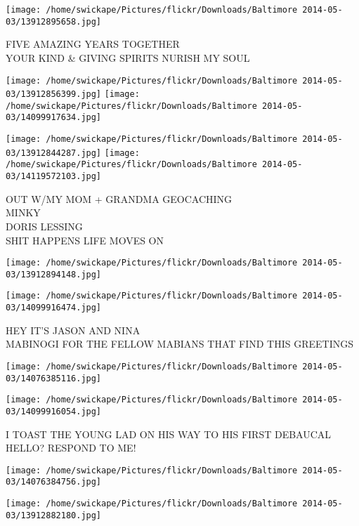 \documentclass[10pt,letterpaper]{article}
\begin{document}
\vspace{0.25in}
\texttt{[image: /home/swickape/Pictures/flickr/Downloads/Baltimore 2014-05-03/13912895658.jpg]}

FIVE AMAZING YEARS TOGETHER\\
YOUR KIND \& GIVING SPIRITS NURISH MY SOUL
\pagebreak

\texttt{[image: /home/swickape/Pictures/flickr/Downloads/Baltimore 2014-05-03/13912856399.jpg]}
\texttt{[image: /home/swickape/Pictures/flickr/Downloads/Baltimore 2014-05-03/14099917634.jpg]}

\texttt{[image: /home/swickape/Pictures/flickr/Downloads/Baltimore 2014-05-03/13912844287.jpg]}
\texttt{[image: /home/swickape/Pictures/flickr/Downloads/Baltimore 2014-05-03/14119572103.jpg]}

OUT W/MY MOM + GRANDMA GEOCACHING\\
MINKY\\
DORIS LESSING\\
SHIT HAPPENS LIFE MOVES ON
\pagebreak

\texttt{[image: /home/swickape/Pictures/flickr/Downloads/Baltimore 2014-05-03/13912894148.jpg]}

\vspace{0.25in}
\texttt{[image: /home/swickape/Pictures/flickr/Downloads/Baltimore 2014-05-03/14099916474.jpg]}

HEY IT'S JASON AND NINA\\
MABINOGI FOR THE FELLOW MABIANS THAT FIND THIS GREETINGS
\pagebreak

\texttt{[image: /home/swickape/Pictures/flickr/Downloads/Baltimore 2014-05-03/14076385116.jpg]}

\vspace{0.25in}
\texttt{[image: /home/swickape/Pictures/flickr/Downloads/Baltimore 2014-05-03/14099916054.jpg]}

I TOAST THE YOUNG LAD ON HIS WAY TO HIS FIRST DEBAUCAL\\
HELLO?  RESPOND TO ME!
\pagebreak

\texttt{[image: /home/swickape/Pictures/flickr/Downloads/Baltimore 2014-05-03/14076384756.jpg]}

\vspace{0.25in}
\texttt{[image: /home/swickape/Pictures/flickr/Downloads/Baltimore 2014-05-03/13912882180.jpg]}
\end{document}
